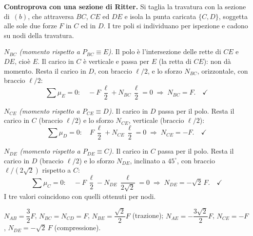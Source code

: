 \begin{esercizio}
\begin{svolgimento}



		
		\noindent\textbf{Controprova con una sezione di
			Ritter.}
		Si taglia la travatura con la sezione di
		\,$(b)$, che attraversa
		$BC$, $CE$ ed $DE$ e isola la punta caricata
		$\{C,D\}$, soggetta alle sole due forze $F$ in $C$ ed
		in $D$. I tre poli si individuano per ispezione e
		cadono su nodi della travatura.
		
		\smallskip
		\textit{$N_{BC}$ (momento rispetto a
			$P_{BC}\equiv E$).} Il polo è l'intersezione delle
		rette di $CE$ e $DE$, cioè $E$. Il carico in $C$ è
		verticale e passa per $E$ (la retta di $CE$): non dà
		momento. Resta il carico in $D$, con braccio $\ell/2$,
		e lo sforzo $N_{BC}$, orizzontale, con braccio $\ell/2$:
		\[
		\sum \mu_E = 0:\quad
		-F\,\frac{\ell}{2} + N_{BC}\,\frac{\ell}{2} = 0
		\;\Rightarrow\;
		N_{BC} = F. \quad\checkmark
		\]
		
		\smallskip
		\textit{$N_{CE}$ (momento rispetto a
			$P_{CE}\equiv D$).} Il carico in $D$ passa per il
		polo. Resta il carico in $C$ (braccio $\ell/2$) e lo
		sforzo $N_{CE}$, verticale (braccio $\ell/2$):
		\[
		\sum \mu_D = 0:\quad
		F\,\frac{\ell}{2} + N_{CE}\,\frac{\ell}{2} = 0
		\;\Rightarrow\;
		N_{CE} = -F. \quad\checkmark
		\]
		
		\smallskip
		\textit{$N_{DE}$ (momento rispetto a
			$P_{DE}\equiv C$).} Il carico in $C$ passa per il
		polo. Resta il carico in $D$ (braccio $\ell/2$) e lo
		sforzo $N_{DE}$, inclinato a $45^\circ$, con braccio
		$\ell/(2\sqrt2)$ rispetto a $C$:
		\[
		\sum \mu_C = 0:\quad
		-F\,\frac{\ell}{2} - N_{DE}\,\frac{\ell}{2\sqrt2} = 0
		\;\Rightarrow\;
		N_{DE} = -\sqrt2\,F. \quad\checkmark
		\]
		I tre valori coincidono con quelli ottenuti per nodi.
		
	\end{svolgimento}
	
	\risultato
	$N_{AB} = \dfrac{3}{2}F$,\;
	$N_{BC} = N_{CD} = F$,\;
	$N_{BE} = \dfrac{\sqrt2}{2}F$ (trazione);\;
	$N_{AE} = -\dfrac{3\sqrt2}{2}F$,\;
	$N_{CE} = -F$,\;
	$N_{DE} = -\sqrt2\,F$ (compressione).
	
\end{esercizio}

